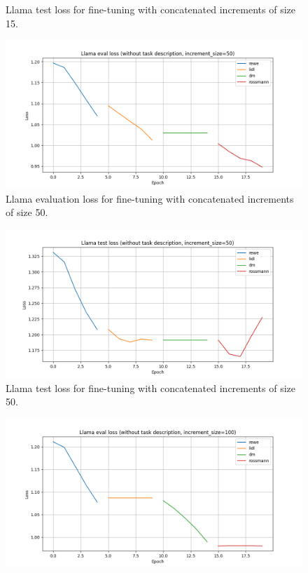 \documentclass[licencjacka,en]{pracamgr}
\begin{document}
\begin{appendices}
\begin{figure}[ht]
    \caption{Llama test loss for fine-tuning with concatenated increments of size 15.}
    \label{fig:llama-inc-tot-15-test}
\end{figure}
\begin{figure}[ht]
    \centering
    \includegraphics[width=0.8\linewidth]{bachelor_images/llama_ft/llama-inc-50-tot-eval.png}
    \caption{Llama evaluation loss for fine-tuning with concatenated increments of size 50.}
    \label{fig:llama-inc-tot-50-eval}
\end{figure}
\begin{figure}[ht]
    \centering
    \includegraphics[width=0.8\linewidth]{bachelor_images/llama_ft/llama-inc-50-tot-test.png}
    \caption{Llama test loss for fine-tuning with concatenated increments of size 50.}
    \label{fig:llama-inc-tot-50-test}
\end{figure}
\begin{figure}[ht]
    \centering
    \includegraphics[width=0.8\linewidth]{bachelor_images/llama_ft/llama-inc-100-tot-eval.png}

\end{figure}
\end{appendices}
\end{document}

